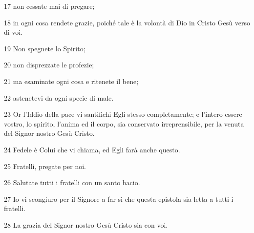 \par 17 non cessate mai di pregare;
\par 18 in ogni cosa rendete grazie, poiché tale è la volontà di Dio in Cristo Gesù verso di voi.
\par 19 Non spegnete lo Spirito;
\par 20 non disprezzate le profezie;
\par 21 ma esaminate ogni cosa e ritenete il bene;
\par 22 astenetevi da ogni specie di male.
\par 23 Or l'Iddio della pace vi santifichi Egli stesso completamente; e l'intero essere vostro, lo spirito, l'anima ed il corpo, sia conservato irreprensibile, per la venuta del Signor nostro Gesù Cristo.
\par 24 Fedele è Colui che vi chiama, ed Egli farà anche questo.
\par 25 Fratelli, pregate per noi.
\par 26 Salutate tutti i fratelli con un santo bacio.
\par 27 Io vi scongiuro per il Signore a far sì che questa epistola sia letta a tutti i fratelli.
\par 28 La grazia del Signor nostro Gesù Cristo sia con voi.


